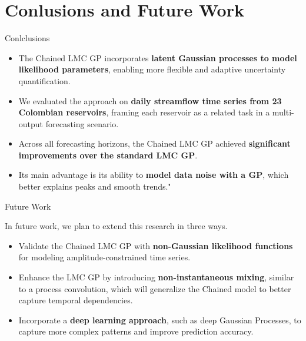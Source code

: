 \section{Conlusions and Future Work}

\begin{frame}{Conlclusions}
	
	\begin{block}{}
	\begin{itemize}
		\item The Chained LMC GP incorporates \textcolor{BrandTeal}{\textbf{latent Gaussian processes to model likelihood parameters}}, enabling more flexible and adaptive uncertainty quantification. 
		\item We evaluated the approach on \textcolor{BrandTeal}{\textbf{daily streamflow time series from 23 Colombian reservoirs}}, framing each reservoir as a related task in a multi-output forecasting scenario.  
		\item Across all forecasting horizons, the Chained LMC GP achieved \textcolor{BrandTeal}{\textbf{significant improvements over the standard LMC GP}}. 
		\item Its main advantage is its ability to \textcolor{BrandTeal}{\textbf{model data noise with a GP}}, which better explains peaks and smooth trends." 
	\end{itemize}
	\end{block}
\end{frame}

\begin{frame}{Future Work}
	\begin{block}{}
		In future work, we plan to extend this research in three ways.
		
		\begin{itemize}
			 \item Validate the Chained LMC GP with \textcolor{BrandTeal}{\textbf{non-Gaussian likelihood functions}} for modeling amplitude-constrained time series. 
			 \item Enhance the LMC GP by introducing \textcolor{BrandTeal}{\textbf{non-instantaneous mixing}}, similar to a process convolution, which will generalize the Chained model to better capture temporal dependencies.
			 \item Incorporate a \textcolor{BrandTeal}{\textbf{deep learning approach}}, such as deep Gaussian Processes, to capture more complex patterns and improve prediction accuracy.
		\end{itemize} 
	\end{block}
\end{frame}

